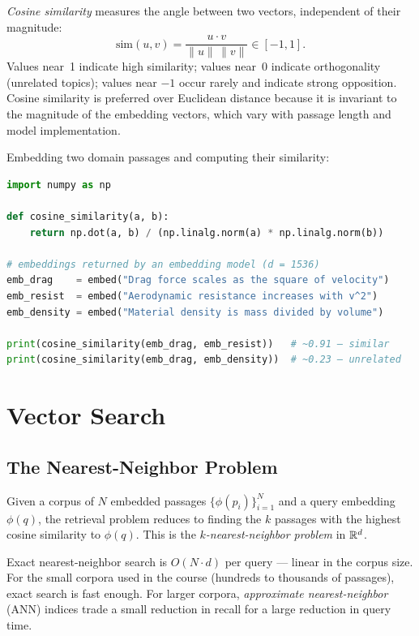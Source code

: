 \emph{Cosine similarity} measures the angle between two vectors, independent of their magnitude:
\begin{equation}
\mathrm{sim}(u, v) = \frac{u \cdot v}{\|u\| \, \|v\|} \in [-1, 1] .
\label{equation:CosineSimilarity}
\end{equation}
Values near~1 indicate high similarity; values near~0 indicate orthogonality (unrelated topics); values near $-1$ occur rarely and indicate strong opposition.
Cosine similarity is preferred over Euclidean distance because it is invariant to the magnitude of the embedding vectors, which vary with passage length and model implementation.

\begin{example}
Embedding two domain passages and computing their similarity:
\begin{lstlisting}[language=python]
import numpy as np

def cosine_similarity(a, b):
    return np.dot(a, b) / (np.linalg.norm(a) * np.linalg.norm(b))

# embeddings returned by an embedding model (d = 1536)
emb_drag    = embed("Drag force scales as the square of velocity")
emb_resist  = embed("Aerodynamic resistance increases with v^2")
emb_density = embed("Material density is mass divided by volume")

print(cosine_similarity(emb_drag, emb_resist))   # ~0.91 — similar
print(cosine_similarity(emb_drag, emb_density))  # ~0.23 — unrelated
\end{lstlisting}
\end{example}

\section{Vector Search}
\label{section:VectorSearch}

\subsection{The Nearest-Neighbor Problem}

Given a corpus of $N$ embedded passages $\{\phi(p_i)\}_{i=1}^N$ and a query embedding $\phi(q)$, the retrieval problem reduces to finding the $k$ passages with the highest cosine similarity to $\phi(q)$.
This is the \emph{$k$-nearest-neighbor problem} in $\mathbb{R}^d$.

Exact nearest-neighbor search is $O(N \cdot d)$ per query — linear in the corpus size.
For the small corpora used in the course (hundreds to thousands of passages), exact search is fast enough.
For larger corpora, \emph{approximate nearest-neighbor} (ANN) indices trade a small reduction in recall for a large reduction in query time.

